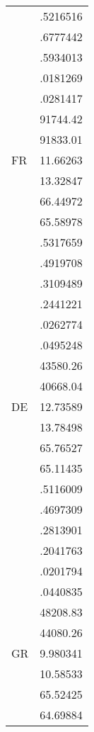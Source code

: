 {\begin{tabular}{l*{1}{c}}
                    &    .5216516\\
                    &    .6777442\\
                    &    .5934013\\
                    &    .0181269\\
                    &    .0281417\\
                    &    91744.42\\
                    &    91833.01\\
FR                  &    11.66263\\
                    &    13.32847\\
                    &    66.44972\\
                    &    65.58978\\
                    &    .5317659\\
                    &    .4919708\\
                    &    .3109489\\
                    &    .2441221\\
                    &    .0262774\\
                    &    .0495248\\
                    &    43580.26\\
                    &    40668.04\\
DE                  &    12.73589\\
                    &    13.78498\\
                    &    65.76527\\
                    &    65.11435\\
                    &    .5116009\\
                    &    .4697309\\
                    &    .2813901\\
                    &    .2041763\\
                    &    .0201794\\
                    &    .0440835\\
                    &    48208.83\\
                    &    44080.26\\
GR                  &    9.980341\\
                    &    10.58533\\
                    &    65.52425\\
                    &    64.69884\\

\end{tabular}}
